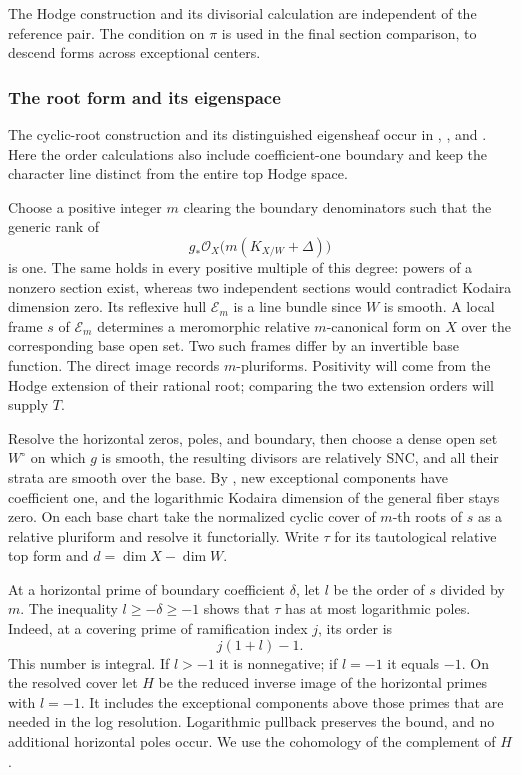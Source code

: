 The Hodge construction and its divisorial calculation are independent
of the reference pair.  The condition on $\pi$ is used in the final
section comparison, to descend forms across exceptional centers.

\subsubsection{The root form and its eigenspace}

The cyclic-root construction and its distinguished eigensheaf occur in
\cite[Remark~2.6]{FujinoMori},
\cite[Lemma~5.2]{AmbroBoundary}, and
\cite[Remark~3.9]{FujinoGongyo}. Here the order calculations also
include coefficient-one boundary and keep the character line distinct
from the entire top Hodge space.

Choose a positive integer $m$ clearing the boundary denominators such
that the generic rank of
\[
 g_*\mathcal O_X\bigl(m(K_{X/W}+\Delta)\bigr)
\]
is one.  The same holds in every positive multiple of this degree:
powers of a nonzero section exist, whereas two independent sections
would contradict Kodaira dimension zero.  Its reflexive hull
$\mathcal E_m$ is a line bundle since $W$ is smooth.  A local frame $s$ of
$\mathcal E_m$ determines a meromorphic relative $m$-canonical form on
$X$ over the corresponding base open set.  Two such frames differ by
an invertible base function.
The direct image records $m$-pluriforms. Positivity will come from the
Hodge extension of their rational root; comparing the two extension
orders will supply $T$.

Resolve the horizontal zeros, poles, and boundary, then choose a dense
open set $W^\circ$ on which $g$ is smooth, the resulting divisors are
relatively SNC, and all their strata are smooth over the base.  By
, new exceptional components have
coefficient one, and the logarithmic Kodaira dimension of the general
fiber stays zero.  On each base chart take the normalized cyclic cover
of $m$-th roots of $s$ as a relative pluriform and resolve it
functorially.  Write $\tau$ for its tautological relative top form and
$d=\dim X-\dim W$.

At a horizontal prime of boundary coefficient $\delta$, let $l$ be
the order of $s$ divided by $m$.
The inequality $l\geq-\delta\geq-1$ shows that $\tau$ has at most
logarithmic poles.  Indeed, at a covering prime of ramification index
$j$, its order is
\begin{equation}\label{rankone:root-order}
 j(1+l)-1.
\end{equation}
This number is integral.  If $l>-1$ it is nonnegative; if $l=-1$ it
equals $-1$.  On the resolved cover let $H$ be the reduced inverse
image of the horizontal primes with $l=-1$.  It includes the
exceptional components above those primes that are needed in the log
resolution.  Logarithmic pullback preserves the bound, and no
additional horizontal poles occur.  We use the cohomology of the
complement of $H$.

